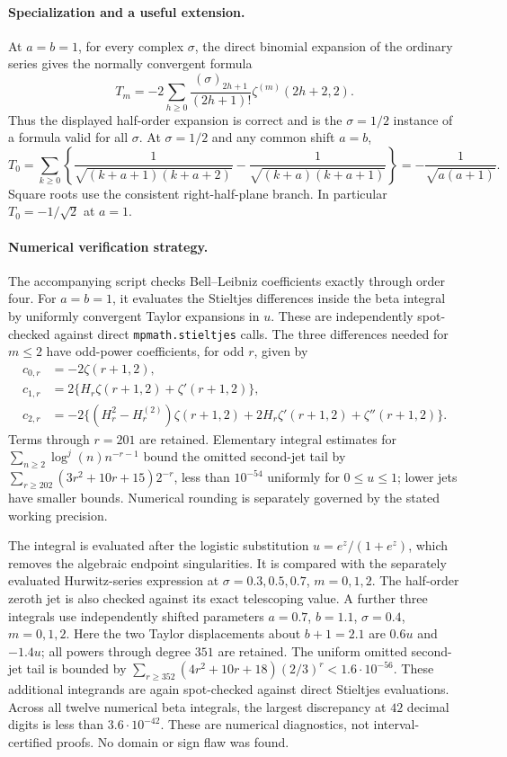 \paragraph{Specialization and a useful extension.}
At $a=b=1$, for every complex $\sigma$, the direct binomial expansion
of the ordinary series gives the normally convergent formula
\[
 T_m=-2\sum_{h\ge0}\frac{(\sigma)_{2h+1}}{(2h+1)!}
        \zeta^{(m)}(2h+2,2).
\]
Thus the displayed half-order expansion is correct and is the
$\sigma=1/2$ instance of a formula valid for all $\sigma$.
At $\sigma=1/2$ and any common shift $a=b$,
\[
 T_0=\sum_{k\ge0}\left\{
 \frac1{\sqrt{(k+a+1)(k+a+2)}}
 -\frac1{\sqrt{(k+a)(k+a+1)}}\right\}
 =-\frac1{\sqrt{a(a+1)}}.
\]
Square roots use the consistent right-half-plane branch.  In particular
$T_0=-1/\sqrt2$ at $a=1$.

\paragraph{Numerical verification strategy.}
The accompanying script checks Bell--Leibniz coefficients exactly
through order four.  For $a=b=1$, it evaluates the Stieltjes differences
inside the beta integral by uniformly convergent Taylor expansions in
$u$.  These are independently spot-checked against direct
\texttt{mpmath.stieltjes} calls.  The three differences needed for
$m\le2$ have odd-power coefficients, for odd $r$, given by
\begin{align*}
 c_{0,r}&=-2\zeta(r+1,2),\\
 c_{1,r}&=2\{H_r\zeta(r+1,2)+\zeta'(r+1,2)\},\\
 c_{2,r}&=-2\{(H_r^2-H_r^{(2)})\zeta(r+1,2)
              +2H_r\zeta'(r+1,2)+\zeta''(r+1,2)\}.
\end{align*}
Terms through $r=201$ are retained.  Elementary integral estimates for
$\sum_{n\ge2}\log^j(n)n^{-r-1}$ bound the omitted second-jet tail by
$\sum_{r\ge202}(3r^2+10r+15)2^{-r}$, less than $10^{-54}$ uniformly
for $0\le u\le1$; lower jets have smaller bounds.  Numerical rounding
is separately governed by the stated working precision.

The integral is evaluated after the logistic substitution
$u=e^z/(1+e^z)$, which removes the algebraic endpoint singularities.
It is compared with the separately evaluated Hurwitz-series expression
at $\sigma=0.3,0.5,0.7$, $m=0,1,2$.  The half-order zeroth jet is
also checked against its exact telescoping value.  A further three
integrals use independently shifted parameters
$a=0.7$, $b=1.1$, $\sigma=0.4$, $m=0,1,2$.  Here the two
Taylor displacements about $b+1=2.1$ are $0.6u$ and $-1.4u$;
all powers through degree $351$ are retained.  The uniform omitted
second-jet tail is bounded by
$\sum_{r\ge352}(4r^2+10r+18)(2/3)^r<1.6\cdot10^{-56}$.
These additional integrands are again spot-checked against direct
Stieltjes evaluations.  Across all twelve numerical beta integrals,
the largest discrepancy at $42$ decimal digits is less than
$3.6\cdot10^{-42}$.  These are numerical diagnostics, not
interval-certified proofs.  No domain or sign flaw was found.
